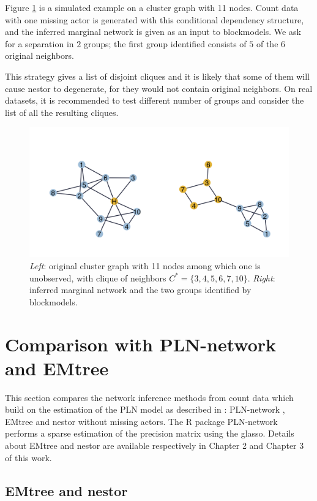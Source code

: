 \begin{subappendices}
Figure \ref{clustBloc} is a simulated example on a cluster graph with 11 nodes. Count data with one missing actor is generated with this conditional dependency structure, and the inferred marginal network is given as an input to blockmodels. We ask for a separation in $2$ groups; the first group identified consists of $5$ of the $6$ original neighbors. 

This strategy gives a list of disjoint cliques and it is likely that some of them will cause nestor to degenerate, for they would not contain original neighbors. On real datasets, it is recommended  to test different number of groups and consider the list of all the resulting cliques.




\begin{figure}
\centering
\includegraphics[width=0.7\linewidth]{figs/cluster_block.png}
\caption{\textit{Left}: original cluster graph with 11 nodes among which one is unobserved, with clique of neighbors $C^*=\{3,4,5,6,7,10\}$. \textit{Right}: inferred marginal network and the two groups identified by blockmodels.}
\label{clustBloc}
\end{figure}





\section{Comparison with PLN-network and EMtree}
This section compares the network inference methods from count data which build on the estimation of the PLN model as described in \citet{CMR18}: PLN-network \citep{CMR19}, EMtree and nestor without missing actors. The R package PLN-network performs a sparse estimation of the precision matrix using the glasso. Details about EMtree and nestor are available respectively in Chapter 2 and Chapter 3 of this work.
\tocless\subsection{EMtree and nestor}

\end{subappendices}

